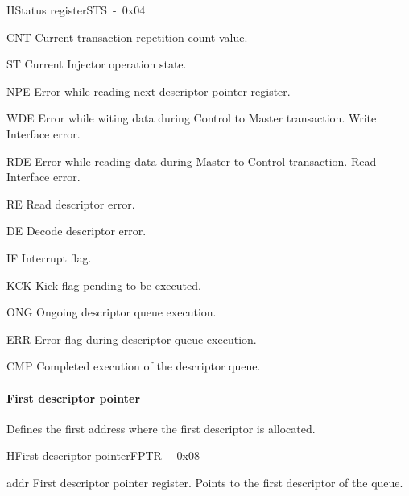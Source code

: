 \begin{register}{H}{Status register}{STS~-~0x04}
    \label{reg_sts}
    \regnewline%
    \begin{regdesc}\begin{reglist}
        \item [CNT]Current transaction repetition count value.
        \item [ST]Current Injector operation state.
        \item [NPE]Error while reading next descriptor pointer register.
        \item [WDE]Error while witing data during Control to Master transaction. Write Interface error.
        \item [RDE]Error while reading data during Master to Control transaction. Read Interface error.
        \item [RE]Read descriptor error.
        \item [DE]Decode descriptor error.
        \item [IF]Interrupt flag.
        \item [KCK]Kick flag pending to be executed.
        \item [ONG]Ongoing descriptor queue execution.
        \item [ERR]Error flag during descriptor queue execution.
        \item [CMP]Completed execution of the descriptor queue.
\end{reglist}\end{regdesc}\end{register}


\paragraph{First descriptor pointer} Defines the first address where the first descriptor is allocated.\\

\begin{register}{H}{First descriptor pointer}{FPTR~-~0x08}
    \label{reg_fptr}%
    \regnewline%
    \begin{regdesc}\begin{reglist}
        \item [addr]First descriptor pointer register. Points to the first descriptor of the queue.
\end{reglist}\end{regdesc}\end{register}


